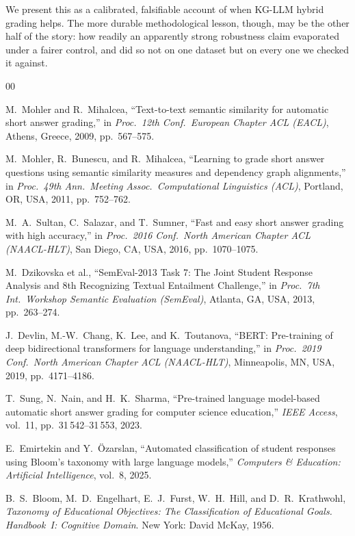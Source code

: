 \documentclass[conference]{IEEEtran}
\begin{document}
We present this as a calibrated, falsifiable account of when KG-LLM
hybrid grading helps. The more durable methodological lesson, though,
may be the other half of the story: how readily an apparently strong
robustness claim evaporated under a fairer control, and did so not on
one dataset but on every one we checked it against.


\begin{thebibliography}{00}

M.~Mohler and R.~Mihalcea,
``Text-to-text semantic similarity for automatic short answer grading,''
in \textit{Proc.\ 12th Conf.\ European Chapter ACL (EACL)},
Athens, Greece, 2009, pp.~567--575.

M.~Mohler, R.~Bunescu, and R.~Mihalcea,
``Learning to grade short answer questions using semantic similarity measures
and dependency graph alignments,''
in \textit{Proc.\ 49th Ann.\ Meeting Assoc.\ Computational Linguistics (ACL)},
Portland, OR, USA, 2011, pp.~752--762.

M.~A.~Sultan, C.~Salazar, and T.~Sumner,
``Fast and easy short answer grading with high accuracy,''
in \textit{Proc.\ 2016 Conf.\ North American Chapter ACL (NAACL-HLT)},
San Diego, CA, USA, 2016, pp.~1070--1075.

M.~Dzikovska et al.,
``SemEval-2013 Task 7: The Joint Student Response Analysis and 8th Recognizing
Textual Entailment Challenge,''
in \textit{Proc.\ 7th Int.\ Workshop Semantic Evaluation (SemEval)},
Atlanta, GA, USA, 2013, pp.~263--274.

J.~Devlin, M.-W.~Chang, K.~Lee, and K.~Toutanova,
``BERT: Pre-training of deep bidirectional transformers for language understanding,''
in \textit{Proc.\ 2019 Conf.\ North American Chapter ACL (NAACL-HLT)},
Minneapolis, MN, USA, 2019, pp.~4171--4186.

T.~Sung, N.~Nain, and H.~K.~Sharma,
``Pre-trained language model-based automatic short answer grading for
computer science education,''
\textit{IEEE Access}, vol.~11, pp.~31\,542--31\,553, 2023.

E.~Emirtekin and Y.~Özarslan,
``Automated classification of student responses using Bloom's taxonomy
with large language models,''
\textit{Computers \& Education: Artificial Intelligence}, vol.~8, 2025.

B.~S.~Bloom, M.~D.~Engelhart, E.~J.~Furst, W.~H.~Hill, and D.~R.~Krathwohl,
\textit{Taxonomy of Educational Objectives: The Classification of Educational Goals.
Handbook~I: Cognitive Domain}.
New York: David McKay, 1956.


\end{thebibliography}
\end{document}
